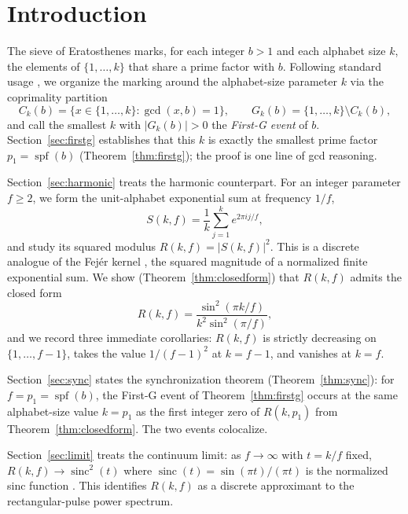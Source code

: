 \documentclass[11pt,reqno]{amsart}
\theoremstyle{plain}
\theoremstyle{definition}
\theoremstyle{remark}
\DeclareMathOperator{\spf}{spf}
\DeclareMathOperator{\sinc}{sinc}
\begin{document}
\section{Introduction}\label{sec:intro}

The sieve of Eratosthenes marks, for each integer $b > 1$ and each
alphabet size $k$, the elements of $\{1,\dots,k\}$ that share a prime
factor with $b$. Following standard usage \cite{Apostol1976,
HardyWright2008}, we organize the marking around the alphabet-size
parameter $k$ via the coprimality partition
\[
  C_{k}(b) = \{x\in\{1,\dots,k\}:\gcd(x,b)=1\},
  \qquad
  G_{k}(b) = \{1,\dots,k\}\setminus C_{k}(b),
\]
and call the smallest $k$ with $|G_{k}(b)|>0$ the \emph{First-G event}
of $b$. Section~\ref{sec:firstg} establishes that this $k$ is exactly
the smallest prime factor $p_{1} = \spf(b)$
(Theorem~\ref{thm:firstg}); the proof is one line of gcd reasoning.

Section~\ref{sec:harmonic} treats the harmonic counterpart. For an
integer parameter $f \ge 2$, we form the unit-alphabet exponential
sum at frequency $1/f$,
\[
  S(k,f) = \frac{1}{k}\sum_{j=1}^{k} e^{2\pi i j/f},
\]
and study its squared modulus $R(k,f) = |S(k,f)|^{2}$. This is a
discrete analogue of the Fej\'{e}r kernel \cite{Fejer1900,Zygmund2002},
the squared magnitude of a normalized finite exponential sum. We show
(Theorem~\ref{thm:closedform}) that $R(k,f)$ admits the closed form
\[
  R(k,f) = \frac{\sin^{2}(\pi k/f)}{k^{2}\sin^{2}(\pi/f)},
\]
and we record three immediate corollaries: $R(k,f)$ is strictly
decreasing on $\{1,\dots,f-1\}$, takes the value $1/(f-1)^{2}$ at
$k=f-1$, and vanishes at $k=f$.

Section~\ref{sec:sync} states the synchronization theorem
(Theorem~\ref{thm:sync}): for $f = p_{1} = \spf(b)$, the First-G
event of Theorem~\ref{thm:firstg} occurs at the same alphabet-size
value $k = p_{1}$ as the first integer zero of $R(k,p_{1})$ from
Theorem~\ref{thm:closedform}. The two events colocalize.

Section~\ref{sec:limit} treats the continuum limit: as $f\to\infty$
with $t = k/f$ fixed, $R(k,f) \to \sinc^{2}(t)$ where
$\sinc(t) = \sin(\pi t)/(\pi t)$ is the normalized sinc function
\cite{Shannon1949,OppenheimSchafer2010}. This identifies $R(k,f)$
as a discrete approximant to the rectangular-pulse power spectrum.
\end{document}
